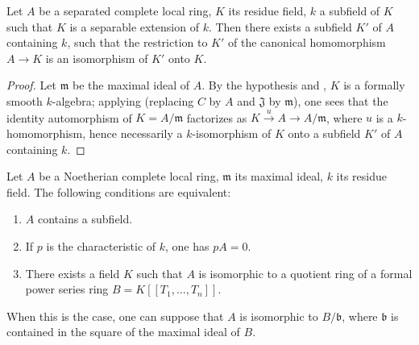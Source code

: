 \begin{corollary}[19.6.2]
\label{0.19.6.2}
Let $A$ be a separated complete local ring, $K$ its residue field, $k$ a subfield of $K$ such that $K$ is a separable extension of $k$.
Then there exists a subfield $K'$ of $A$ containing $k$, such that the restriction to $K'$ of the canonical homomorphism $A\to K$ is an isomorphism of $K'$ onto $K$.
\end{corollary}

\begin{proof}
Let $\mathfrak{m}$ be the maximal ideal of $A$.
By the hypothesis and , $K$ is a formally smooth $k$-algebra;
applying  (replacing $C$ by $A$ and $\mathfrak{J}$ by $\mathfrak{m}$), one sees that the identity automorphism of $K=A/\mathfrak{m}$ factorizes as $K\xrightarrow{u}A\to A/\mathfrak{m}$, where $u$ is a $k$-homomorphism, hence necessarily a $k$-isomorphism of $K$ onto a subfield $K'$ of $A$ containing $k$.
\end{proof}

\begin{corollary}[19.6.3]
\label{0.19.6.3}
Let $A$ be a Noetherian complete local ring, $\mathfrak{m}$ its maximal ideal, $k$ its residue field.
The following conditions are equivalent:
\begin{enumerate}
  \item[a)] $A$ contains a subfield.
  \item[b)] If $p$ is the characteristic of $k$, one has $pA=0$.
  \item[c)] There exists a field $K$ such that $A$ is isomorphic to a quotient ring of a formal power series ring $B=K[[T_1,\ldots,T_n]]$.
\end{enumerate}
When this is the case, one can suppose that $A$ is isomorphic to $B/\mathfrak{b}$, where $\mathfrak{b}$ is contained in the square of the maximal ideal of $B$.
\end{corollary}

